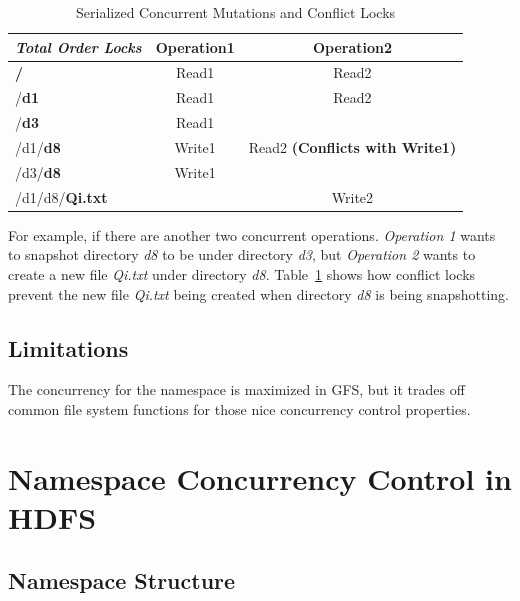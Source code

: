 \begin{table}[ht]
	\centering
	\begin{tabular}{|l|c|c|}
		\hline
		\textbf{\textit{Total Order Locks}}             & \textbf{Operation1} & \textbf{Operation2}                    \\ \hline
		\textbf{\color{red}/}             & Read1      & Read2                         \\ \hline
		/\textbf{\color{red}d1}           & Read1      & Read2                         \\ \hline
		/\textbf{\color{red}d3}           & Read1      & ~                             \\ \hline
		/d1/\textbf{\color{red}d8}        & Write1     & Read2 \textbf{(Conflicts with Write1)} \\ \hline
		/d3/\textbf{\color{red}d8}       & Write1     & ~                             \\ \hline
		/d1/d8/\textbf{\color{red}Qi.txt} & ~          & Write2                        \\ \hline
	\end{tabular}
	\caption{Serialized Concurrent Mutations and Conflict Locks}
	\label{table:gfsLock2}
\end{table}

\noindent For example, if there are another two concurrent operations. \textit{Operation 1} wants to snapshot directory \textit{d8} to be under directory \textit{d3}, but \textit{Operation 2} wants to create a new file \textit{Qi.txt} under directory \textit{d8}. Table~\ref{table:gfsLock2} shows how conflict locks prevent the new file \textit{Qi.txt} being created when directory \textit{d8} is being snapshotting.

\subsection{Limitations}
\noindent The concurrency for the namespace is maximized in GFS, but it trades off common file system functions for those nice concurrency control properties.

\section{Namespace Concurrency Control in HDFS}

\subsection{Namespace Structure}

